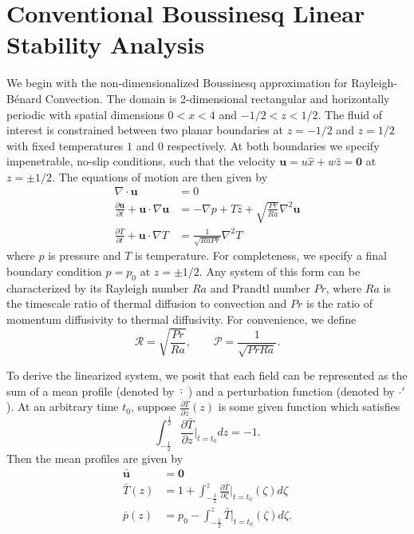 \documentclass[reprint,amsmath,amssymb,aps]{revtex4-1}
\begin{document}
\section{Conventional Boussinesq Linear Stability Analysis}\label{sec:boussinesq}
We begin with the non-dimensionalized Boussinesq approximation for Rayleigh-Bénard Convection. The domain is 2-dimensional rectangular and horizontally periodic with spatial dimensions $0 < x < 4$ and $-1/2 < z < 1/2$. The fluid of interest is constrained between two planar boundaries at $z = -1/2$ and $z = 1/2$ with fixed temperatures $1$ and $0$ respectively. At both boundaries we specify impenetrable, no-slip conditions, such that the velocity $\mathbf{u} = u \hat{x} + w \hat{z} = \mathbf{0}$ at $z = \pm 1/2$. The equations of motion are then given by
\begin{align}
    \nabla \cdot \mathbf{u} &= 0 \label{EQ:motion1}\\
    \frac{\partial \mathbf{u}}{\partial t} + \mathbf{u} \cdot \nabla \mathbf{u} &= - \nabla p + T \hat{z} + \sqrt{\frac{Pr}{Ra}} \nabla^2 \mathbf{u} \label{EQ:motion2}\\
    \frac{\partial T}{\partial t} + \mathbf{u} \cdot \nabla T &= \frac{1}{\sqrt{RaPr}} \nabla^2 T \label{EQ:motion3}
\end{align}
where $p$ is pressure and $T$ is temperature. For completeness, we specify a final boundary condition $p = p_0$ at $z = \pm 1/2$. Any system of this form can be characterized by its Rayleigh number $Ra$ and Prandtl number $Pr$, where $Ra$ is the timescale ratio of thermal diffusion to convection and $Pr$ is the ratio of momentum diffusivity to thermal diffusivity.  For convenience, we define 
\begin{equation}
\mathcal{R} = \sqrt{\frac{Pr}{Ra}}, \qquad \mathcal{P} = \frac{1}{\sqrt{Pr Ra}}.
\end{equation}
\par To derive the linearized system, we posit that each field can be represented as the sum of a mean profile (denoted by $\bar{\cdot } \;$) and a perturbation function (denoted by $\cdot'$). At an arbitrary time $t_0$, suppose $\frac{\partial \bar{T}}{\partial z} (z)$ is some given function which satisfies
\begin{equation}
    \int_{-\frac{1}{2}}^{\frac{1}{2}} \frac{\partial \bar{T}}{\partial z}\Big|_{t=t_0} dz = -1.
\end{equation}
Then the mean profiles are given by
\begin{align}
    \mathbf{\bar{u}} &= \mathbf{0} \\
    \bar{T}(z) &= 1 + \int_{-\frac{1}{2}}^{z} \frac{\partial \bar{T}}{\partial \zeta}\Big|_{t=t_0}(\zeta) d\zeta \\
    \bar{p}(z) &= p_0 - \int_{-\frac{1}{2}}^z \bar{T}\Big|_{t=t_0}(\zeta) d\zeta.
\end{align}
\end{document}
